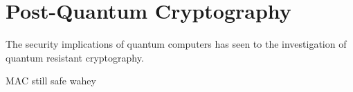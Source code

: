 \section{Post-Quantum Cryptography}
The security implications of quantum computers has seen to the investigation of quantum resistant cryptography.

MAC still safe wahey







